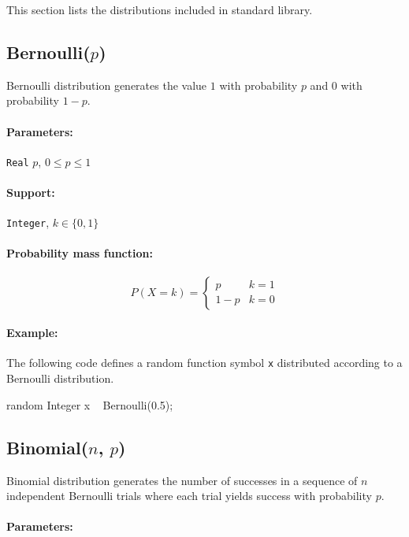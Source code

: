 This section lists the distributions included in \bl standard library.

\subsection{Bernoulli($p$)}
Bernoulli distribution generates the value $1$ with probability $p$ and $0$ with probability $1-p$. 

\paragraph*{Parameters:} 
\begin{itemize*}
\item[] \verb|Real|
 $p$, $0 \leq p \leq 1$ 
\end{itemize*}
\paragraph*{Support:} \verb|Integer|, $k \in \{0, 1\}$ 

\paragraph*{Probability mass function:}
\[
	P(X = k) = \left\{
	  \begin{array}{lr}
	    p &    k = 1 \\
	    1-p &  k = 0
	  \end{array}
	\right.
\]

\paragraph*{Example:}
The following code defines a random function symbol \verb|x| distributed according to a Bernoulli distribution.
\begin{blogcode}
random Integer x ~ Bernoulli(0.5);
\end{blogcode}

\subsection{Binomial($n$, $p$)} 
Binomial distribution generates the number of successes in a sequence of $n$ independent Bernoulli trials where each trial yields success with probability $p$.

\paragraph*{Parameters:} 

